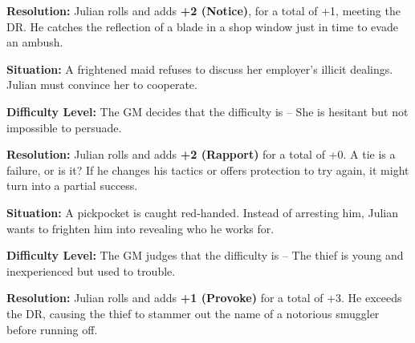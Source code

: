 \begin{multicols}{2}
\begin{Example}
		\noindent\textbf{Resolution:} Julian rolls  and adds  \textbf{+2 (Notice)}, for a total of +1, meeting the DR. He catches the reflection of a blade in a shop window just in time to evade an ambush.
	\end{Example}


	\begin{Example}
		\textbf{Situation:} A frightened maid refuses to discuss her employer’s illicit dealings. Julian must convince her to cooperate.

		\noindent\textbf{Difficulty Level:} The GM decides that the difficulty is \Challenging – She is hesitant but not impossible to persuade.

		\noindent\textbf{Resolution:} Julian rolls \FudgeRes{+---} and adds \textbf{+2 (Rapport)} for a total of +0. A tie is a failure, or is it? If he changes his tactics or offers protection to try again, it might turn into a partial success.
	\end{Example}


	\begin{Example}
		\textbf{Situation:} A pickpocket is caught red-handed. Instead of arresting him, Julian wants to frighten him into revealing who he works for.

		\noindent\textbf{Difficulty Level:} The GM judges that the difficulty is \Basic – The thief is young and inexperienced but used to trouble.

		\noindent\textbf{Resolution:} Julian rolls  and adds \textbf{+1 (Provoke)} for a total of +3. He exceeds the DR, causing the thief to stammer out the name of a notorious smuggler before running off.
	\end{Example}

	\end{multicols}

\EndBoxPage